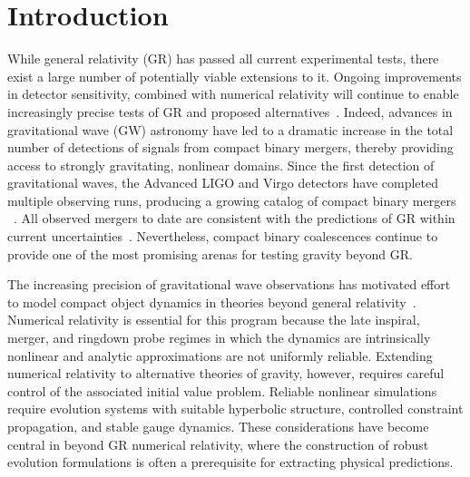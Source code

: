 \section{Introduction}
\label{sec:intro}
While general relativity (GR) has passed all current experimental tests, there exist a large number of potentially viable extensions to it. Ongoing improvements in detector sensitivity, combined with numerical relativity will continue to enable increasingly precise tests of GR and proposed alternatives~\cite{Abbott2025GWTC3GR,Yunes2025GWTests,Abac2025GW250114,
Giri2025AdSBlackShells,Clough2024,Bambi2025Mimickers,
Yunes2013_LRR_GRTests,Yagi2016_BHTestsGR,Meidam2014,Berti2015,Yang2017}.
Indeed, advances in gravitational wave (GW) astronomy have led to a dramatic increase in the total number of detections of
signals from compact binary mergers, thereby providing access to strongly
gravitating, nonlinear domains. Since the first detection of gravitational waves, 
the Advanced LIGO and Virgo detectors have completed multiple
observing runs, producing a growing catalog of compact binary mergers
~\cite{Abbott2019,GWTC2,GWTC3,GWTC4}. All observed mergers to date are consistent
with the predictions of GR within current uncertainties~\cite{Abbott2016,Abbott2016b,Abbott2019}. Nevertheless, compact binary coalescences continue to provide one of the most promising arenas for testing gravity beyond GR.

The increasing precision of gravitational wave observations has motivated effort to model compact object dynamics in theories beyond general relativity~\cite{Cardoso2012NRHEP,Corman2024,Afshordi2024BlackHolesInsideOut,Bambi2025Mimickers,Bernard2025GenericEFTGWTests}. Numerical relativity is
essential for this program because the late inspiral, merger, and ringdown
probe regimes in which the dynamics are intrinsically nonlinear and
analytic approximations are not uniformly reliable. Extending numerical
relativity to alternative theories of gravity, however, requires careful
control of the associated initial value problem. Reliable nonlinear
simulations require evolution systems with suitable hyperbolic structure,
controlled constraint propagation, and stable gauge dynamics. These
considerations have become central in beyond GR numerical relativity,
where the construction of robust evolution formulations is often a
prerequisite for extracting physical predictions.

